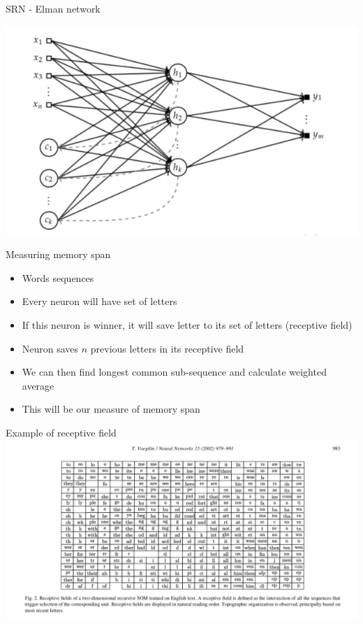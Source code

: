 \documentclass{article}
\begin{document}
\begin{frame}[fragile]{SRN - Elman network}

\includegraphics[width=\textwidth]{elman}

\end{frame}

\begin{frame}[fragile]{Measuring memory span}

\begin{itemize}
\item Words sequences
\item Every neuron will have set of letters
\item If this neuron is winner, it will save letter to its set of letters (receptive field)
\item Neuron saves $n$ previous letters in its receptive field
\item We can then find longest common sub-sequence and calculate weighted average
\item This will be our measure of memory span
\end{itemize}

\end{frame}

\begin{frame}[fragile]{Example of receptive field}
\includegraphics[width=\textwidth]{receptive_field}
\end{frame}
\end{document}
